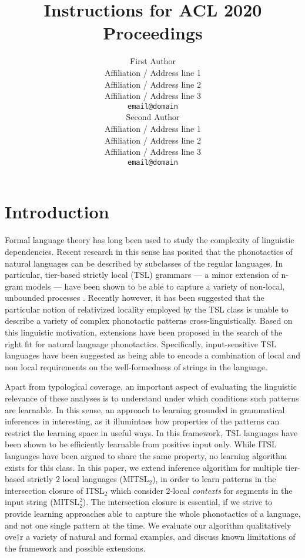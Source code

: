 \documentclass[11pt,a4paper]{article}
\title{Instructions for ACL 2020 Proceedings}
\author{First Author \\
  Affiliation / Address line 1 \\
  Affiliation / Address line 2 \\
  Affiliation / Address line 3 \\
  \texttt{email@domain} \\\And
  Second Author \\
  Affiliation / Address line 1 \\
  Affiliation / Address line 2 \\
  Affiliation / Address line 3 \\
  \texttt{email@domain} \\}
\date{}
\begin{document}
\maketitle
\begin{abstract}
\end{abstract}


\section{Introduction}

Formal language theory has long been used to study the complexity of linguistic dependencies.
Recent research in this sense has posited that the phonotactics of natural languages can be described by subclasses of the regular languages.
In particular, tier-based strictly local (TSL) grammars  ---  a minor extension of n-gram models --- have been shown to be able to capture a variety of non-local, unbounded processes \cite{HeinzRawalTanner,McMullin16,McMullinHansson16}.
Recently however, it has been suggested that the particular notion of relativized locality employed by the TSL class is unable to describe a variety of complex phonotactic patterns cross-linguistically.
Based on this linguistic motivation, extensions have been proposed in the search of the right fit for natural language phonotactics.
Specifically, input-sensitive TSL languages have been suggested as being able to encode a combination of local and non local requirements on the well-formedness of strings in the language.

Apart from typological coverage, an important aspect of evaluating the linguistic relevance of these analyses is to understand under which conditions such patterns are learnable.
In this sense, an approach to learning grounded in grammatical inferences in interesting, as it illumintaes how properties of the patterns can restrict the learning space in useful ways.
In this framework, TSL languages have been shown to be efficiently learnable from positive input only.
While ITSL languages have been argued to share the same property, no learning algorithm exists for this class.
In this paper, we extend \citet{McMullinSCIL2019} inference algorithm for multiple tier-based strictly $2$ local languages (MITSL$_2$), in order to learn patterns in the intersection closure of ITSL$_2$ which consider $2$-local \emph{contexts} for segments in the input string (MITSL$^2_2$). 
The intersection closure is essential, if we strive to provide learning approaches able to capture the whole phonotactics of a language, and not one single pattern at the time.
We evaluate our algorithm qualitatively ove†r a variety of natural and formal examples, and discuss known limitations of the framework and possible extensions.
\end{document}
